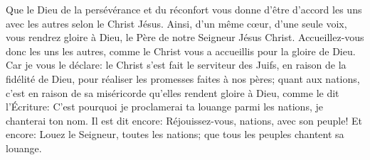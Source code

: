 Que le Dieu de la persévérance et du réconfort
	vous donne d’être d’accord les uns avec les autres selon le Christ Jésus.
Ainsi, d’un même cœur, d’une seule voix,
	vous rendrez gloire à Dieu, le Père de notre Seigneur Jésus Christ.
Accueillez-vous donc les uns les autres,
	comme le Christ vous a accueillis pour la gloire de Dieu.
Car je vous le déclare: le Christ s’est fait le serviteur des Juifs,
		en raison de la fidélité de Dieu,
	pour réaliser les promesses faites à nos pères;
	quant aux nations,
		c’est en raison de sa miséricorde qu’elles rendent gloire à Dieu,
	comme le dit l’Écriture:
	C’est pourquoi je proclamerai ta louange parmi les nations,
		je chanterai ton nom.
Il est dit encore: Réjouissez-vous, nations, avec son peuple!
	Et encore: Louez le Seigneur, toutes les nations;
	que tous les peuples chantent sa louange.
